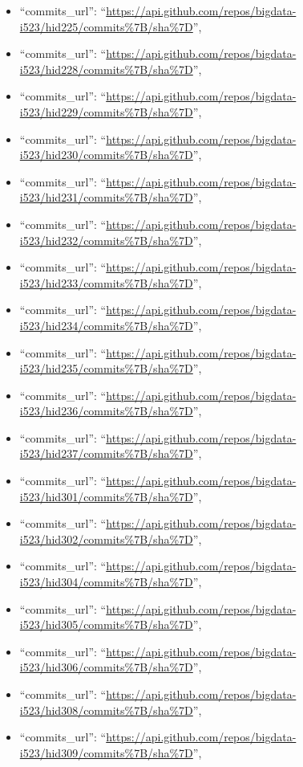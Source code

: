 \begin{itemize}
\item
  ``commits\_url'':
  ``\url{https://api.github.com/repos/bigdata-i523/hid225/commits\%7B/sha\%7D}'',
\item
  ``commits\_url'':
  ``\url{https://api.github.com/repos/bigdata-i523/hid228/commits\%7B/sha\%7D}'',
\item
  ``commits\_url'':
  ``\url{https://api.github.com/repos/bigdata-i523/hid229/commits\%7B/sha\%7D}'',
\item
  ``commits\_url'':
  ``\url{https://api.github.com/repos/bigdata-i523/hid230/commits\%7B/sha\%7D}'',
\item
  ``commits\_url'':
  ``\url{https://api.github.com/repos/bigdata-i523/hid231/commits\%7B/sha\%7D}'',
\item
  ``commits\_url'':
  ``\url{https://api.github.com/repos/bigdata-i523/hid232/commits\%7B/sha\%7D}'',
\item
  ``commits\_url'':
  ``\url{https://api.github.com/repos/bigdata-i523/hid233/commits\%7B/sha\%7D}'',
\item
  ``commits\_url'':
  ``\url{https://api.github.com/repos/bigdata-i523/hid234/commits\%7B/sha\%7D}'',
\item
  ``commits\_url'':
  ``\url{https://api.github.com/repos/bigdata-i523/hid235/commits\%7B/sha\%7D}'',
\item
  ``commits\_url'':
  ``\url{https://api.github.com/repos/bigdata-i523/hid236/commits\%7B/sha\%7D}'',
\item
  ``commits\_url'':
  ``\url{https://api.github.com/repos/bigdata-i523/hid237/commits\%7B/sha\%7D}'',
\item
  ``commits\_url'':
  ``\url{https://api.github.com/repos/bigdata-i523/hid301/commits\%7B/sha\%7D}'',
\item
  ``commits\_url'':
  ``\url{https://api.github.com/repos/bigdata-i523/hid302/commits\%7B/sha\%7D}'',
\item
  ``commits\_url'':
  ``\url{https://api.github.com/repos/bigdata-i523/hid304/commits\%7B/sha\%7D}'',
\item
  ``commits\_url'':
  ``\url{https://api.github.com/repos/bigdata-i523/hid305/commits\%7B/sha\%7D}'',
\item
  ``commits\_url'':
  ``\url{https://api.github.com/repos/bigdata-i523/hid306/commits\%7B/sha\%7D}'',
\item
  ``commits\_url'':
  ``\url{https://api.github.com/repos/bigdata-i523/hid308/commits\%7B/sha\%7D}'',
\item
  ``commits\_url'':
  ``\url{https://api.github.com/repos/bigdata-i523/hid309/commits\%7B/sha\%7D}'',

\end{itemize}
